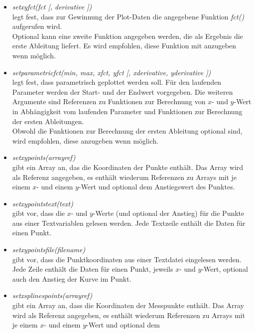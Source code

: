 \documentclass[ngerman,origlongtable]{scrartcl}
\begin{document}
\begin{itemize}
\item	\textit{set\textunderscore{}xy\textunderscore{}fct(fct [, derivative ])}\/\\
legt fest, dass zur Gewinnung der Plot-Daten die angegebene Funktion
\textit{fct()\/} aufgerufen wird.\\
Optional kann eine zweite Funktion angegeben werden, die als Ergebnis die
erste Ableitung liefert. Es wird empfohlen, diese Funktion mit anzugeben wenn
möglich.
\item	\textit{set\textunderscore{}parametric\textunderscore{}fct(min, max, xfct, yfct [, xderivative, yderivative ])\/}\\
legt fest, dass parametrisch geplottet werden soll. Für den laufenden
Parameter werden der Start- und der Endwert vorgegeben.
Die weiteren Argumente sind Referenzen zu Funktionen zur Berechnung von
\(x\)- und \(y\)-Wert in Abhängigkeit vom laufenden Parameter und
Funktionen zur Berechnung der ersten Ableitungen.\\
Obwohl die Funktionen zur Berechnung der ersten Ableitung optional sind,
wird empfohlen, diese anzugeben wenn möglich.
\item	\textit{set\textunderscore{}xy\textunderscore{}points(arrayref)\/}\\
gibt ein Array an, das die Koordinaten der Punkte enthält.
Das Array wird als Referenz angegeben, es enthält wiederum Referenzen
zu Arrays mit je einem \(x\)- und einem \(y\)-Wert und optional dem
Anstiegswert des Punktes.
\item	\textit{set\textunderscore{}xy\textunderscore{}points\textunderscore{}text(text)\/}\\
gibt vor, dass die \(x\)- und \(y\)-Werte (und optional der Anstieg) für
die Punkte aus einer Textvariablen gelesen werden.
Jede Textzeile enthält die Daten für einen Punkt.
\item	\textit{set\textunderscore{}xy\textunderscore{}points\textunderscore{}file(filename)\/}\\
gibt vor, dass die Punktkoordinaten aus einer Textdatei eingelesen werden.
Jede Zeile enthält die Daten für einen Punkt, jeweils \(x\)- und
\(y\)-Wert, optional auch den Anstieg der Kurve im Punkt.
\item	\textit{set\textunderscore{}xsplines\textunderscore{}points(arrayref)}\\
gibt ein Array an, dass die Koordinaten der Messpunkte enthält.
Das Array wird als Referenz angegeben, es enthält wiederum Referenzen
zu Arrays mit je einem \(x\)- und einem \(y\)-Wert und optional dem

\end{itemize}
\end{document}
